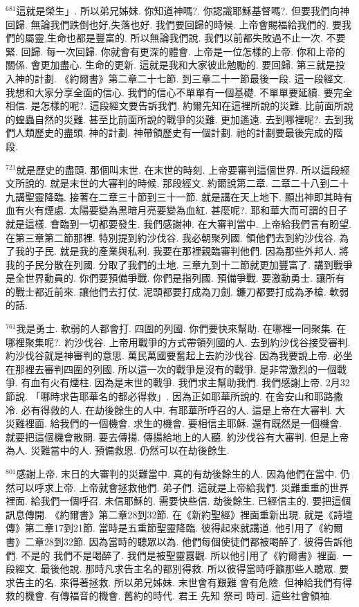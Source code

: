 \documentclass{book}
\begin{document}
$^{681}$這就是榮生」.
所以弟兄姊妹.
你知道神嗎?.
你認識耶穌基督嗎?.
但要我們向神回歸.
無論我們跌倒也好,失落也好.
我們要回歸的時候.
上帝會賜福給我們的.
要我們的屬靈,生命也都是豐富的.
所以無論我們說.
我們以前都失敗過不止一次.
不要緊.
回歸.
每一次回歸.
你就會有更深的體會.
上帝是一位怎樣的上帝.
你和上帝的關係.
會更加盡心.
生命的更新.
這就是我和大家彼此勉勵的.
要回歸.
第三就是投入神的計劃.
《約爾書》第二章二十七節.
到三章二十一節最後一段.
這一段經文.
我想和大家分享全面的信心.
我們的信心不單單有一個基礎.
不單單要延續.
要完全相信.
是怎樣的呢?.
這段經文要告訴我們.
約爾先知在這裡所說的災難.
比前面所說的蝗蟲自然的災難.
甚至比前面所說的戰爭的災難.
更加遙遠.
去到哪裡呢?.
去到我們人類歷史的盡頭.
神的計劃.
神帶領歷史有一個計劃.
祂的計劃要最後完成的階段.

$^{721}$就是歷史的盡頭.
那個叫末世.
在末世的時刻.
上帝要審判這個世界.
所以這段經文所說的.
就是末世的大審判的時候.
那段經文.
約爾說第二章.
二章二十八到二十九講聖靈降臨.
接著在二章三十節到三十一節.
就是講在天上地下.
顯出神即其時有血有火有煙處.
太陽要變為黑暗月亮要變為血紅.
甚麼呢?.
耶和華大而可謂的日子就是這樣.
會臨到一切都要發生.
我們感謝神.
在大審判當中.
上帝給我們言有盼望.
在第三章第二節那裡.
特別提到約沙伐谷.
我必朝聚列國.
領他們去到約沙伐谷.
為了我的子民.
就是我的產業與私利.
我要在那裡親臨審判他們.
因為那些外邦人.
將我的子民分散在列國.
分取了我們的土地.
三章九到十二節就更加豐富了.
講到戰爭是全世界動員的.
你們要預備爭戰.
你們是指列國.
預備爭戰.
要激動勇士.
讓所有的戰士都近前來.
讓他們去打仗.
泥頭都要打成為刀劍.
鐮刀都要打成為矛槍.
軟弱的話.

$^{761}$我是勇士.
軟弱的人都會打.
四圍的列國.
你們要快來幫助.
在哪裡一同聚集.
在哪裡聚集呢?.
約沙伐谷.
上帝用戰爭的方式帶領列國的人.
去到約沙伐谷接受審判.
約沙伐谷就是神審判的意思.
萬民萬國要奮起上去約沙伐谷.
因為我要說上帝.
必坐在那裡去審判四圍的列國.
所以這一次的戰爭是沒有的戰爭.
是非常激烈的一個戰爭.
有血有火有煙柱.
因為是末世的戰爭.
我們求主幫助我們.
我們感謝上帝.
2月32節說.
「哪時求告耶華名的都必得救」.
因為正如耶華所說的.
在舍安山和耶路撒冷.
必有得救的人.
在劫後餘生的人中.
有耶華所呼召的人.
這是上帝在大審判.
大災難裡面.
給我們的一個機會.
求生的機會.
要相信主耶穌.
還有既然是一個機會.
就要把這個機會散開.
要去傳揚.
傳揚給地上的人聽.
約沙伐谷有大審判.
但是上帝為人.
災難當中的人.
預備救恩.
仍然可以在劫後餘生.

$^{801}$感謝上帝.
末日的大審判的災難當中.
真的有劫後餘生的人.
因為他們在當中.
仍然可以呼求上帝.
上帝就會拯救他們.
弟子們.
這就是上帝給我們.
災難重重的世界裡面.
給我們一個呼召.
未信耶穌的.
需要快些信.
劫後餘生.
已經信主的.
要把這個訊息傳開.
《約爾書》第二章28到32節.
在《新約聖經》裡面重新出現.
就是《詩壇傳》第二章17到21節.
當時是五重節聖靈降臨.
彼得起來就講道.
他引用了《約爾書》二章28到32節.
因為當時的聽眾以為.
他們每個使徒們都被喝醉了.
彼得告訴他們.
不是的 我們不是喝醉了.
我們是被聖靈囂觀.
所以他引用了《約爾書》裡面.
一段經文.
最後他說.
那時凡求告主名的都別得救.
所以彼得當時呼籲那些人聽眾.
要求告主的名.
來得著拯救.
所以弟兄姊妹.
末世會有艱難 會有危險.
但神給我們有得救的機會.
有傳福音的機會.
舊約的時代.
君王 先知 祭司 時司.
這些社會領袖.
\end{document}
